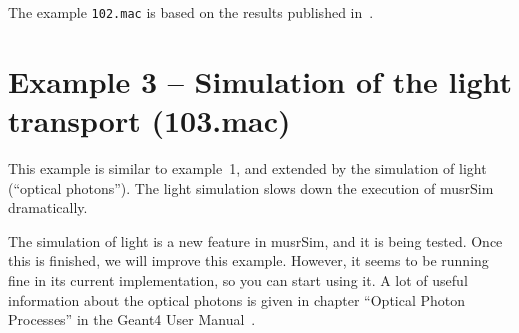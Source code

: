 \documentclass[twoside]{dis04}
\begin{document}
The example {\tt 102.mac} is based on the results published in~\cite{FirstExperience}.
\section{Example 3 -- Simulation of the light transport (103.mac)}
This example is similar to example~1, and extended by the simulation of light (``optical
photons'').  The light simulation slows down the execution of musrSim dramatically.

The simulation of light is a new feature in musrSim, and it is being tested.  Once
this is finished, we will improve this example.  However, it seems to be running fine
in its current implementation, so you can start using it.  A lot of useful information
about the optical photons is given in chapter ``Optical Photon Processes'' in
the Geant4 User Manual~\cite{geantUserManual}.\\
\end{document}
